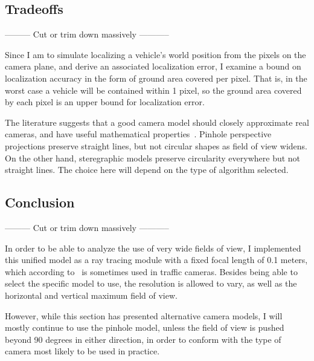 \documentclass[a4paper,12pt,twoside,openright]{report}
\begin{document}
\subsection{Tradeoffs}

 --------- Cut or trim down massively -----------


Since I am to simulate localizing a vehicle's world position from the pixels
on the camera plane, and derive an associated localization error, I examine a bound
on localization accuracy in the form of ground area covered per pixel. That is,
in the worst case a vehicle will be contained within 1 pixel, so the ground
area covered by each pixel is an upper bound for localization error.


The literature suggests that a good camera model should closely approximate
real cameras, and have useful mathematical properties~\cite{fleckperspective}.
Pinhole perspective projections preserve straight lines, but not circular
shapes as field of view widens. On the other hand, steregraphic models 
preserve circularity everywhere but not straight lines. The choice here
will depend on the type of algorithm selected.

\subsection{Conclusion}
 --------- Cut or trim down massively -----------

In order to be able to analyze the use of very wide fields of view, I 
implemented this unified model as a ray tracing module with a fixed
focal length of 0.1 meters, which according to~\cite{lumeneracamera}
is sometimes used in traffic cameras. Besides being able to select
the specific model to use, the resolution is allowed to vary,
as well as the horizontal and vertical maximum field of view.

However, while this section has presented alternative camera models, I will mostly
continue to use the pinhole model, unless the field of view is pushed beyond
90 degrees in either direction, in order to conform with the type of camera
most likely to be used in practice.
\end{document}

